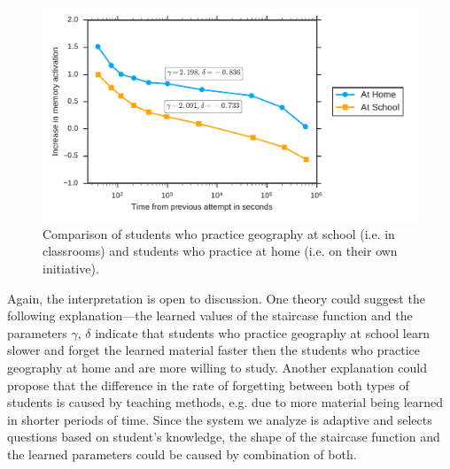\begin{figure}[htbp]
  \centering
  \includegraphics[width=\textwidth]{img/at-home-vs-at-school}
  \caption{Comparison of students who practice geography at school (i.e. in classrooms) and students who practice at home (i.e. on their own initiative).}
  \label{fig:at-home-vs-at-school}
\end{figure}

Again, the interpretation is open to discussion. One theory could suggest the following explanation---the learned values of the staircase function and the parameters $\gamma$, $\delta$ indicate that students who practice geography at school learn slower and forget the learned material faster then the students who practice geography at home and are more willing to study. Another explanation could propose that the difference in the rate of forgetting between both types of students is caused by teaching methods, e.g. due to more material being learned in shorter periods of time. Since the system we analyze is adaptive and selects questions based on student's knowledge, the shape of the staircase function and the learned parameters could be caused by combination of both.
